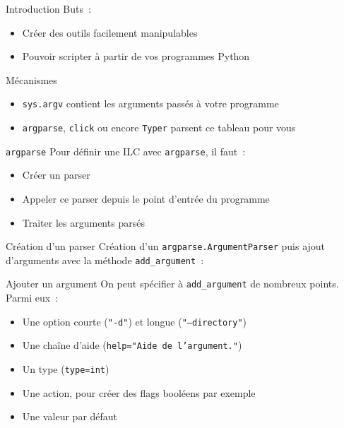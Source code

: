 \begin{frame}{Introduction}
  Buts~:
  \begin{itemize}[<+->]
    \item Créer des outils facilement manipulables
    \item Pouvoir scripter à partir de vos programmes Python
  \end{itemize}
\end{frame}

\begin{frame}{Mécanismes}
  \begin{itemize}[<+->]
    \item \texttt{sys.argv} contient les arguments passés à votre programme
    \item \texttt{argparse}, \texttt{click} ou encore \texttt{Typer} parsent ce tableau pour vous
  \end{itemize}  
\end{frame}

\begin{frame}{\texttt{argparse}}
  Pour définir une ILC avec \texttt{argparse}, il faut~:
  \begin{itemize}[<+->]
    \item Créer un parser
    \item Appeler ce parser depuis le point d'entrée du programme
    \item Traiter les arguments parsés
  \end{itemize}
\end{frame}

\begin{frame}{Création d'un parser}
  Création d'un \texttt{argparse.ArgumentParser} puis ajout d'arguments avec la méthode \texttt{add\_argument}~:
\end{frame}

\begin{frame}{Ajouter un argument}
  On peut spécifier à \texttt{add\_argument} de nombreux points. Parmi eux~:

  \begin{itemize}[<+->]
    \item Une option courte (\texttt{"-d"}) et longue (\texttt{"--directory"})
    \item Une chaîne d'aide (\texttt{help="Aide de l'argument."})
    \item Un type (\texttt{type=int})
    \item Une action, pour créer des flags booléens par exemple
    \item Une valeur par défaut
  \end{itemize}

\end{frame}

